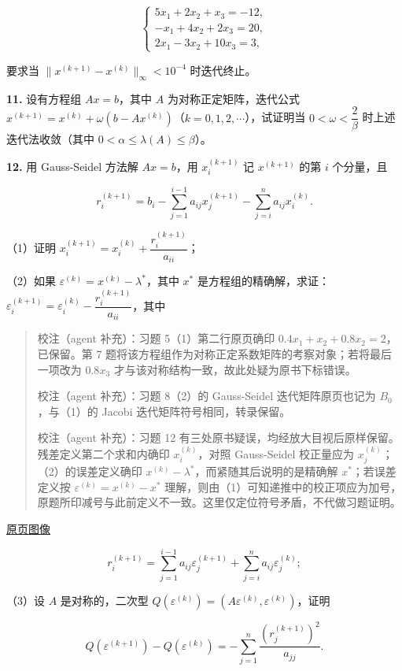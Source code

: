 \documentclass[
  10pt,
  fontset=fandol]{ctexart}
\begin{document}
\[
\begin{cases}
5x_1+2x_2+x_3=-12,\\
-x_1+4x_2+2x_3=20,\\
2x_1-3x_2+10x_3=3,
\end{cases}
\]

要求当 \(\|x^{(k+1)}-x^{(k)}\|_\infty<10^{-4}\) 时迭代终止。

\textbf{11.} 设有方程组 \(Ax=b\)，其中 \(A\) 为对称正定矩阵，迭代公式 \(x^{(k+1)}=x^{(k)}+\omega(b-Ax^{(k)})\)（\(k=0,1,2,\cdots\)），试证明当 \(0<\omega<\dfrac2\beta\) 时上述迭代法收敛（其中 \(0<\alpha\leqslant\lambda(A)\leqslant\beta\)）。

\textbf{12.} 用 Gauss-Seidel 方法解 \(Ax=b\)，用 \(x_i^{(k+1)}\) 记 \(x^{(k+1)}\) 的第 \(i\) 个分量，且

\[
r_i^{(k+1)}=b_i-\sum_{j=1}^{i-1}a_{ij}x_j^{(k+1)}-\sum_{j=i}^n a_{ij}x_i^{(k)}.
\]

（1）证明 \(x_i^{(k+1)}=x_i^{(k)}+\dfrac{r_i^{(k+1)}}{a_{ii}}\)；

（2）如果 \(\varepsilon^{(k)}=x^{(k)}-\lambda^*\)，其中 \(x^*\) 是方程组的精确解，求证：\(\varepsilon_i^{(k+1)}=\varepsilon_i^{(k)}-\dfrac{r_i^{(k+1)}}{a_{ii}}\)，其中

\begin{quote}
校注（agent 补充）：习题 5（1）第二行原页确印 \(0.4x_1+x_2+0.8x_2=2\)，已保留。第 7 题将该方程组作为对称正定系数矩阵的考察对象；若将最后一项改为 \(0.8x_3\) 才与该对称结构一致，故此处疑为原书下标错误。

校注（agent 补充）：习题 8（2）的 Gauss-Seidel 迭代矩阵原页也记为 \(B_0\)，与（1）的 Jacobi 迭代矩阵符号相同，转录保留。

校注（agent 补充）：习题 12 有三处原书疑误，均经放大目视后原样保留。残差定义第二个求和内确印 \(x_i^{(k)}\)，对照 Gauss-Seidel 校正量应为 \(x_j^{(k)}\)；（2）的误差定义确印 \(x^{(k)}-\lambda^*\)，而紧随其后说明的是精确解 \(x^*\)；若误差定义按 \(\varepsilon^{(k)}=x^{(k)}-x^*\) 理解，则由（1）可知递推中的校正项应为加号，原题所印减号与此前定义不一致。这里仅定位符号矛盾，不代做习题证明。
\end{quote}

\href{../../source-images/pdf-232.jpeg}{原页图像}

\[
r_i^{(k+1)}=\sum_{j=1}^{i-1}a_{ij}\varepsilon_j^{(k+1)}+\sum_{j=i}^n a_{ij}\varepsilon_j^{(k)};
\]

（3）设 \(A\) 是对称的，二次型 \(Q(\varepsilon^{(k)})=(A\varepsilon^{(k)},\varepsilon^{(k)})\)，证明

\[
Q(\varepsilon^{(k+1)})-Q(\varepsilon^{(k)})=-\sum_{j=1}^n\frac{(r_j^{(k+1)})^2}{a_{jj}}.
\]
\end{document}
